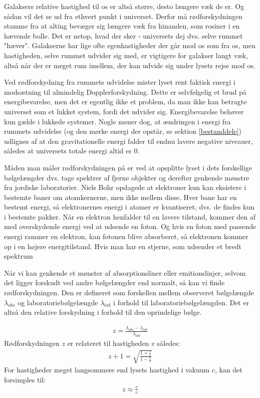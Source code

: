 Galaksers relative hastighed til os er altså større, desto længere væk de er. Og sådan vil det se ud fra ethvert punkt i universet. Derfor må rødforskydningen stamme fra at alting bevæger sig længere væk fra hinanden, som rosiner i en hævende bolle. Det er netop, hvad der sker - universets dej dvs. selve rummet "hæver". Galakserne har lige ofte egenhastigheder der går mod os som fra os, men hastigheden, selve rummet udvider sig med, er vigtigere for galakser langt væk, altså når der er meget rum imellem, der kan udvide sig under lysets rejse mod os. 

Ved rødforskydning fra rummets udvidelse mister lyset rent faktisk energi i modsætning til almindelig Dopplerforskydning. Dette er selvfølgelig et brud på energibevarelse, men det er egentlig ikke et problem, da man ikke kan betragte universet som et lukket system, fordi det udvider sig. Energibevarelse behøver kun gælde i lukkede systemer. Nogle mener dog, at ændringen i energi fra rummets udvidelse (og den mørke energi der opstår, se sektion \ref{bestanddele}) udlignes af at den gravitationelle energi falder til endnu lavere negative niveauer, således at universets totale energi altid er 0.

Måden man måler rødforskydningen på er ved at opsplitte lyset i dets forskellige bølgelængder dvs. tage spektrer af fjerne objekter og derefter genkende mønstre fra jordiske laboratorier. Niels Bohr opdagede at elektroner kun kan eksistere i bestemte baner om atomkernerne, men ikke mellem disse. Hver bane har en bestemt energi, så elektronernes energi i atomer er kvantiseret, dvs. de findes kun i bestemte pakker. Når en elektron henfalder til en lavere tilstand, kommer den af med overskydende energi ved at udsende en foton. Og hvis en foton med passende energi rammer en elektron, kan fotonen blive absorberet, så elektronen kommer op i en højere energitilstand. Hvis man har en stjerne, som udsender et bredt spektrum


Når vi kan genkende et mønster af absorptionsliner eller emitionslinjer, selvom det ligger forskudt ved andre bølgelængder end normalt, så kan vi finde rødforskydningen. Den er defineret som forskellen mellem observeret bølgelængde $\lambda_{obs}$ og laboratoriebølgelængde $\lambda_{lab}$ i forhold til laboratoriebølgelængden. Det er altså den relative forskydning i forhold til den oprindelige bølge.

\begin{align}
	z=\frac{\lambda_{obs}-\lambda_{lab}}{\lambda_{lab}}
\end{align}
Rødforskydningen $z$ er relateret til hastigheden $v$ således:
\begin{align}
	z+1=\sqrt{\frac{1+\frac{v}{c}}{1-\frac{v}{c}}}
\end{align}
For hastigheder meget langsommere end lysets hastighed i vakuum $c$, kan det forsimples til:
\begin{align}
	z\approx\frac{v}{c}
\end{align}


